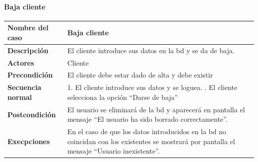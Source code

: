 \paragraph{Baja cliente}
\begin{table}[H]
    \centering
    \small
    \begin{tabularx}{0.8\textwidth}{|p{3.5cm}|X|}
        \hline
        \rowcolor{lightgray}
        \textbf{Nombre del caso}  & \textbf{Baja cliente}                                                                                                                                \\
        \hline
        \textbf{Descripción}      & El cliente introduce sus datos en la \gls{bd} y se da de baja.                                                                                       \\
        \hline
        \textbf{Actores}          & Cliente                                                                                                                                              \\
        \hline
        \textbf{Precondición}     & El cliente debe estar dado de alta y debe existir                                                                                                    \\
        \hline
        \textbf{Secuencia normal} & 1. El cliente introduce sus datos y se loguea. \newline
        2. El cliente selecciona la opción ``Darse de baja''                                                                                                                             \\
        \hline
        \textbf{Postcondición}    & El usuario se eliminará de la \gls{bd} y aparecerá en pantalla el mensaje ``El usuario ha sido borrado correctamente''.                              \\
        \hline
        \textbf{Execpciones}      & En el caso de que los datos introducidos en la \gls{bd} no coincidan con los existentes se mostrará por pantalla el mensaje ``Usuario inexistente''. \\
        \hline
    \end{tabularx}
\end{table}
